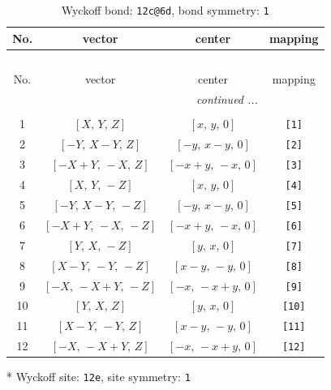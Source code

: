 \documentclass[fleqn,8pt]{jsarticle}
\begin{document}
\begin{longtable}{cccc}
\caption{Wyckoff bond: {\tt 12c@6d}, bond symmetry: {\tt 1}}
 \\
 \hline \hline
No. & vector & center & mapping \\ \hline \endfirsthead

\multicolumn{3}{l}{\tablename\ \thetable{}} \\
 \hline \hline
No. & vector & center & mapping \\ \hline \endhead

 \hline \hline
\multicolumn{3}{r}{\footnotesize\it continued ...} \\ \endfoot

 \hline \hline
\multicolumn{3}{r}{} \\ \endlastfoot

1 & $\left[ X,\, Y,\, Z \right]$ & $\left[ x,\, y,\, 0 \right]$ & {\tt [1]} \\ \hline
2 & $\left[ - Y,\, X - Y,\, Z \right]$ & $\left[ - y,\, x - y,\, 0 \right]$ & {\tt [2]} \\ \hline
3 & $\left[ - X + Y,\, - X,\, Z \right]$ & $\left[ - x + y,\, - x,\, 0 \right]$ & {\tt [3]} \\ \hline
4 & $\left[ X,\, Y,\, - Z \right]$ & $\left[ x,\, y,\, 0 \right]$ & {\tt [4]} \\ \hline
5 & $\left[ - Y,\, X - Y,\, - Z \right]$ & $\left[ - y,\, x - y,\, 0 \right]$ & {\tt [5]} \\ \hline
6 & $\left[ - X + Y,\, - X,\, - Z \right]$ & $\left[ - x + y,\, - x,\, 0 \right]$ & {\tt [6]} \\ \hline
7 & $\left[ Y,\, X,\, - Z \right]$ & $\left[ y,\, x,\, 0 \right]$ & {\tt [7]} \\ \hline
8 & $\left[ X - Y,\, - Y,\, - Z \right]$ & $\left[ x - y,\, - y,\, 0 \right]$ & {\tt [8]} \\ \hline
9 & $\left[ - X,\, - X + Y,\, - Z \right]$ & $\left[ - x,\, - x + y,\, 0 \right]$ & {\tt [9]} \\ \hline
10 & $\left[ Y,\, X,\, Z \right]$ & $\left[ y,\, x,\, 0 \right]$ & {\tt [10]} \\ \hline
11 & $\left[ X - Y,\, - Y,\, Z \right]$ & $\left[ x - y,\, - y,\, 0 \right]$ & {\tt [11]} \\ \hline
12 & $\left[ - X,\, - X + Y,\, Z \right]$ & $\left[ - x,\, - x + y,\, 0 \right]$ & {\tt [12]} \\
\end{longtable}
* Wyckoff site: {\tt 12e}, site symmetry: {\tt 1}
\renewcommand{\arraystretch}{1.2}
\end{document}
